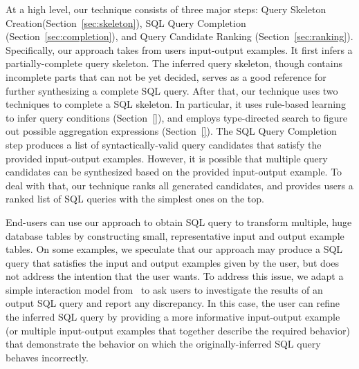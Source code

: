 At a high level, our technique consists of three major steps: Query Skeleton
Creation(Section~\ref{sec:skeleton}), SQL Query Completion
(Section~\ref{sec:completion}), and Query Candidate Ranking (Section~\ref{sec:ranking}).
Specifically, our approach takes from users input-output examples. It first infers
a partially-complete query skeleton. The inferred query skeleton, though contains
incomplete parts that can not be yet decided, serves as a good reference
for further synthesizing a complete SQL query.
After that, our technique uses two techniques to complete a SQL skeleton.
In particular, it 
uses rule-based learning to infer query conditions (Section~\ref{}), and
 employs type-directed search to figure out possible aggregation
expressions (Section~\ref{}).
The SQL Query Completion step produces a list of syntactically-valid
query candidates that satisfy the provided input-output examples.
However, it is possible that multiple query candidates can be synthesized based on the
provided input-output example. To deal with that, our technique
ranks all generated candidates,
and provides users a ranked list of SQL queries with the
simplest ones on the top. 


End-users can use our approach to obtain SQL query to transform
multiple, huge database tables by constructing small, representative
input and output example tables. On some examples, we speculate
that our approach
may produce a SQL query that satisfies the input and output examples
given by the user, but does not address the intention
that the user wants. To address this issue, we adapt a simple
interaction model from~\cite{Harris:2011} to ask users to investigate the results of
an output SQL query and report any discrepancy. In this case,
the user can refine the inferred SQL query by providing a more
informative input-output example (or multiple input-output examples
that together describe the required behavior) that demonstrate the behavior on
which the originally-inferred SQL query behaves incorrectly.










